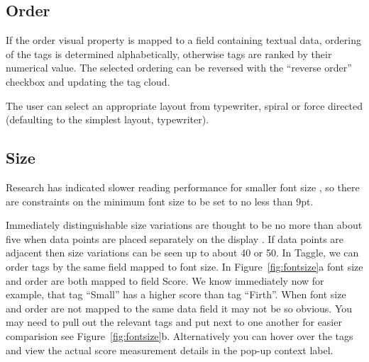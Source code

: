 \subsection{Order}

If the order visual property is mapped to a field containing textual data, ordering of the tags is determined alphabetically, otherwise tags are ranked by their numerical value. The selected ordering can be reversed with the ``reverse order'' checkbox and updating the tag cloud.

The user can select an appropriate layout from typewriter, spiral or force directed (defaulting to the simplest layout, typewriter).

\subsection{Size}

Research has indicated slower reading performance for smaller font size \citep[pg 107, chap 11:8][]{usability06}, so there are constraints on the minimum font size to be set to no less than 9pt.

Immediately distinguishable size variations are thought to be no more than about five when data points are placed separately on the display \citep{bertin83}. If data points are adjacent then size variations can be seen up to about 40 or 50. In Taggle, we can order tags by the same field mapped to font size. In Figure~\vref{fig:fontsize}a font size and order are both mapped to field Score. We know immediately now for example, that tag ``Small'' has a higher score than tag ``Firth''. When font size and order are not mapped to the same data field it may not be so obvious. You may need to pull out the relevant tags and put next to one another for easier comparision \textemdash see Figure~\vref{fig:fontsize}b. Alternatively you can hover over the tags and view the actual score measurement details in the pop-up context label.

